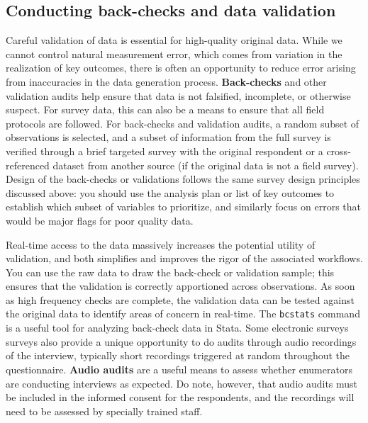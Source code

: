 \subsection{Conducting back-checks and data validation}

Careful validation of data is essential for high-quality original data.
While we cannot control natural measurement error,
which comes from variation in the realization of key outcomes,
there is often an opportunity to reduce error arising from inaccuracies in the data generation process.
\textbf{Back-checks} and
other validation audits help ensure that data is not falsified, incomplete, or otherwise suspect.
For survey data, this can also be a means to ensure that all field protocols are followed.
For back-checks and validation audits, a random subset of observations is selected,
and a subset of information from the full survey is
verified through a brief targeted survey with the original respondent
or a cross-referenced dataset from another source (if the original data is not a field survey).
Design of the back-checks or validations follows the same survey design
principles discussed above: you should use the analysis plan
or list of key outcomes to establish which subset of variables to prioritize,
and similarly focus on errors that would be major flags for poor quality data.

Real-time access to the data massively increases the potential utility of validation,
and both simplifies and improves the rigor of the associated workflows.
You can use the raw data to draw the back-check or validation sample;
this ensures that the validation is correctly apportioned across observations.
As soon as high frequency checks are complete,
the validation data can be tested against
the original data to identify areas of concern in real-time.
The \texttt{bcstats} command is a useful tool for analyzing back-check data in Stata.\cite{white2016bcstats}
Some electronic surveys surveys also provide a unique opportunity
to do audits through audio recordings of the interview,
typically short recordings triggered at random throughout the questionnaire.
\textbf{Audio audits}
are a useful means to assess whether enumerators are conducting interviews as expected.
Do note, however, that audio audits must be included in the informed consent for the respondents,
and the recordings will need to be assessed by specially trained staff.


